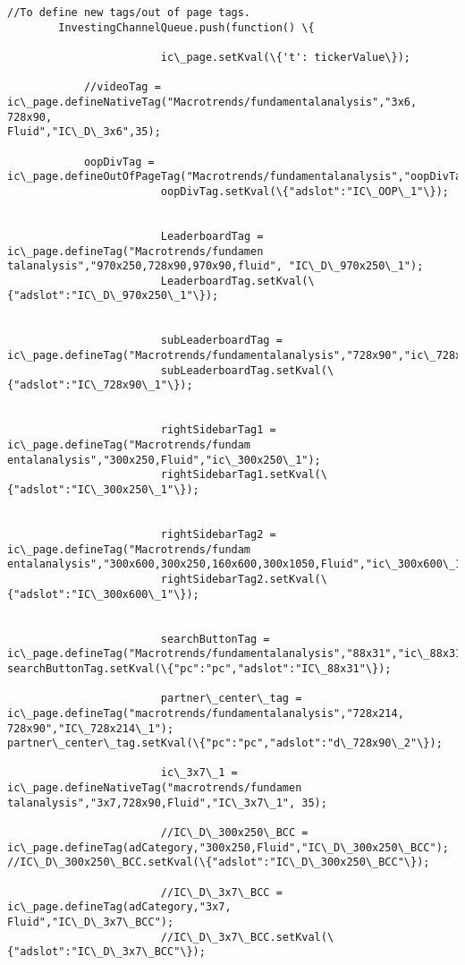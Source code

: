 \documentclass[11pt]{article}
\begin{document}
\begin{Verbatim}[commandchars=\\\{\}]
        //To define new tags/out of page tags.
        InvestingChannelQueue.push(function() \{

                        ic\_page.setKval(\{'t': tickerValue\});

            //videoTag =
ic\_page.defineNativeTag("Macrotrends/fundamentalanalysis","3x6, 728x90,
Fluid","IC\_D\_3x6",35);

            oopDivTag =
ic\_page.defineOutOfPageTag("Macrotrends/fundamentalanalysis","oopDivTag\_1");
                        oopDivTag.setKval(\{"adslot":"IC\_OOP\_1"\});


                        LeaderboardTag = ic\_page.defineTag("Macrotrends/fundamen
talanalysis","970x250,728x90,970x90,fluid", "IC\_D\_970x250\_1");
                        LeaderboardTag.setKval(\{"adslot":"IC\_D\_970x250\_1"\});


                        subLeaderboardTag =
ic\_page.defineTag("Macrotrends/fundamentalanalysis","728x90","ic\_728x90\_1");
                        subLeaderboardTag.setKval(\{"adslot":"IC\_728x90\_1"\});


                        rightSidebarTag1 = ic\_page.defineTag("Macrotrends/fundam
entalanalysis","300x250,Fluid","ic\_300x250\_1");
                        rightSidebarTag1.setKval(\{"adslot":"IC\_300x250\_1"\});


                        rightSidebarTag2 = ic\_page.defineTag("Macrotrends/fundam
entalanalysis","300x600,300x250,160x600,300x1050,Fluid","ic\_300x600\_1");
                        rightSidebarTag2.setKval(\{"adslot":"IC\_300x600\_1"\});


                        searchButtonTag =
ic\_page.defineTag("Macrotrends/fundamentalanalysis","88x31","ic\_88x31\_1");
searchButtonTag.setKval(\{"pc":"pc","adslot":"IC\_88x31"\});

                        partner\_center\_tag =
ic\_page.defineTag("macrotrends/fundamentalanalysis","728x214,
728x90","IC\_728x214\_1");
partner\_center\_tag.setKval(\{"pc":"pc","adslot":"d\_728x90\_2"\});

                        ic\_3x7\_1 = ic\_page.defineNativeTag("macrotrends/fundamen
talanalysis","3x7,728x90,Fluid","IC\_3x7\_1", 35);

                        //IC\_D\_300x250\_BCC =
ic\_page.defineTag(adCategory,"300x250,Fluid","IC\_D\_300x250\_BCC");
//IC\_D\_300x250\_BCC.setKval(\{"adslot":"IC\_D\_300x250\_BCC"\});

                        //IC\_D\_3x7\_BCC = ic\_page.defineTag(adCategory,"3x7,
Fluid","IC\_D\_3x7\_BCC");
                        //IC\_D\_3x7\_BCC.setKval(\{"adslot":"IC\_D\_3x7\_BCC"\});



\end{Verbatim}
\end{document}
